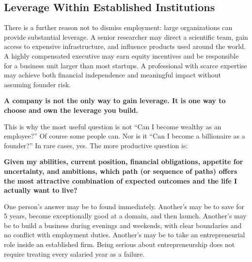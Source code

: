 \subsection{Leverage Within Established Institutions}

There is a further reason not to dismiss employment: large organizations can provide substantial leverage. A senior researcher may direct a scientific team, gain access to expensive infrastructure, and influence products used around the world. A highly compensated executive may earn equity incentives and be responsible for a business unit larger than most startups. A professional with scarce expertise may achieve both financial independence and meaningful impact without assuming founder risk.

\textbf{A company is not the only way to gain leverage. It is one way to choose and own the leverage you build.}

This is why the most useful question is not ``Can I become wealthy as an employee?'' Of course some people can. Nor is it ``Can I become a billionaire as a founder?'' In rare cases, yes. The more productive question is:

\textbf{Given my abilities, current position, financial obligations, appetite for uncertainty, and ambitions, which path (or sequence of paths) offers the most attractive combination of expected outcomes and the life I actually want to live?}

One person's answer may be to found immediately. Another's may be to save for 5 years, become exceptionally good at a domain, and then launch. Another's may be to build a business during evenings and weekends, with clear boundaries and no conflict with employment duties. Another's may be to take an entrepreneurial role inside an established firm. Being serious about entrepreneurship does not require treating every salaried year as a failure.
